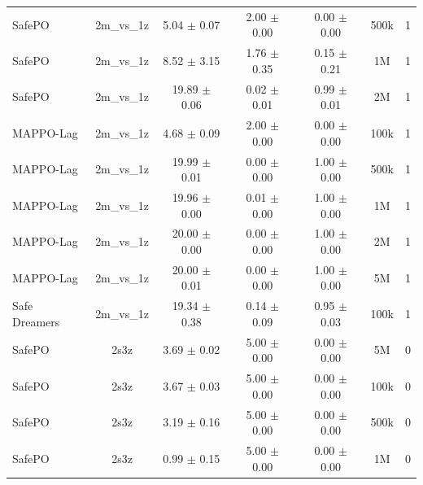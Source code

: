 \begin{longtable}{lcccccc}
SafePO & 2m\_vs\_1z & \textcolor{green!60!black}{5.04 $\pm$ 0.07} & \textcolor{green!60!black}{2.00 $\pm$ 0.00} & \textcolor{green!60!black}{0.00 $\pm$ 0.00} & 500k & 1 \\
SafePO & 2m\_vs\_1z & \textcolor{green!60!black}{8.52 $\pm$ 3.15} & \textcolor{green!60!black}{1.76 $\pm$ 0.35} & \textcolor{green!60!black}{0.15 $\pm$ 0.21} & 1M & 1 \\
SafePO & 2m\_vs\_1z & \textcolor{red!70!black}{19.89 $\pm$ 0.06} & \textcolor{red!70!black}{0.02 $\pm$ 0.01} & \textcolor{red!70!black}{0.99 $\pm$ 0.01} & 2M & 1 \\
MAPPO-Lag & 2m\_vs\_1z & \textcolor{green!60!black}{4.68 $\pm$ 0.09} & \textcolor{green!60!black}{2.00 $\pm$ 0.00} & \textcolor{green!60!black}{0.00 $\pm$ 0.00} & 100k & 1 \\
MAPPO-Lag & 2m\_vs\_1z & \textcolor{red!70!black}{19.99 $\pm$ 0.01} & \textcolor{red!70!black}{0.00 $\pm$ 0.00} & \textcolor{red!70!black}{1.00 $\pm$ 0.00} & 500k & 1 \\
MAPPO-Lag & 2m\_vs\_1z & \textcolor{red!70!black}{19.96 $\pm$ 0.00} & \textcolor{red!70!black}{0.01 $\pm$ 0.00} & \textcolor{red!70!black}{1.00 $\pm$ 0.00} & 1M & 1 \\
MAPPO-Lag & 2m\_vs\_1z & \textcolor{red!70!black}{2\textcolor{red!70!black}{0.00 $\pm$ 0.00}} & 0.00 $\pm$ 0.00 & \textcolor{red!70!black}{1.00 $\pm$ 0.00} & 2M & 1 \\
MAPPO-Lag & 2m\_vs\_1z & \textcolor{red!70!black}{20.00 $\pm$ 0.01} & \textcolor{red!70!black}{0.00 $\pm$ 0.00} & \textcolor{red!70!black}{1.00 $\pm$ 0.00} & 5M & 1 \\
Safe Dreamers & 2m\_vs\_1z & 19.34 $\pm$ 0.38 & 0.14 $\pm$ 0.09 & 0.95 $\pm$ 0.03 & 100k & 1 \\
\midrule
SafePO & 2s3z & \textcolor{green!60!black}{3.69 $\pm$ 0.02} & \textcolor{green!60!black}{5.00 $\pm$ 0.00} & \textcolor{green!60!black}{0.00 $\pm$ 0.00} & 5M & 0 \\
SafePO & 2s3z & \textcolor{green!60!black}{3.67 $\pm$ 0.03} & \textcolor{green!60!black}{5.00 $\pm$ 0.00} & \textcolor{green!60!black}{0.00 $\pm$ 0.00} & 100k & 0 \\
SafePO & 2s3z & \textcolor{green!60!black}{3.19 $\pm$ 0.16} & \textcolor{green!60!black}{5.00 $\pm$ 0.00} & \textcolor{green!60!black}{0.00 $\pm$ 0.00} & 500k & 0 \\
SafePO & 2s3z & \textcolor{green!60!black}{0.99 $\pm$ 0.15} & \textcolor{green!60!black}{5.00 $\pm$ 0.00} & \textcolor{green!60!black}{0.00 $\pm$ 0.00} & 1M & 0 \\

\end{longtable}
